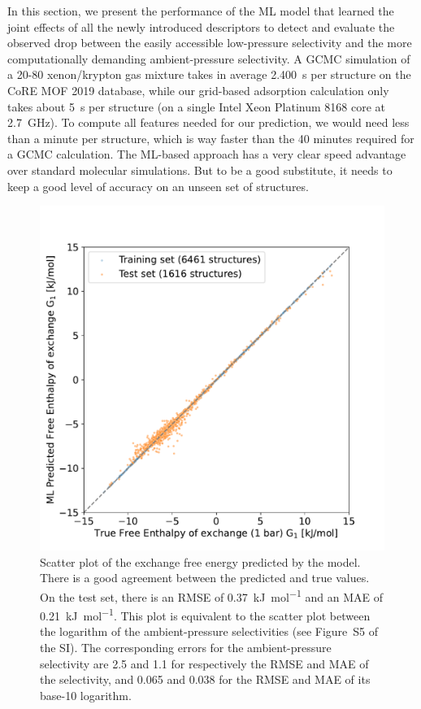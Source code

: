 \documentclass[main]{subfiles}
\begin{document}
In this section, we present the performance of the ML model that learned the joint effects of all the newly introduced descriptors to detect and evaluate the observed drop between the easily accessible low-pressure selectivity and the more computationally demanding ambient-pressure selectivity.
A GCMC simulation of a 20-80 xenon/krypton gas mixture takes in average \SI{2,400}{\second} per structure on the CoRE MOF 2019 database, while our grid-based adsorption calculation only takes about \SI{5}{\second} per structure (on a single Intel Xeon Platinum 8168 core at \SI{2.7}{\giga\hertz}). To compute all features needed for our prediction, we would need less than a minute per structure, which is way faster than the 40 minutes required for a GCMC calculation. The ML-based approach has a very clear speed advantage over standard molecular simulations. But to be a good substitute, it needs to keep a good level of accuracy on an unseen set of structures.

\begin{figure}[ht]
\centering
  \includegraphics[width=0.5\linewidth]{figures/4-ml/main/Scatterplot_G1_prediction.pdf}
  \caption{Scatter plot of the exchange free energy predicted by the model. There is a good agreement between the predicted and true values. On the test set, there is an RMSE of \SI{0.37}{\kilo\joule\per\mole} and an MAE of \SI{0.21}{\kilo\joule\per\mole}. This plot is equivalent to the scatter plot between the logarithm of the ambient-pressure selectivities (see Figure~S5 of the SI). The corresponding errors for the ambient-pressure selectivity are 2.5 and 1.1 for respectively the RMSE and MAE of the selectivity, and 0.065 and 0.038 for the RMSE and MAE of its base-10 logarithm. }
  \label{fgr:G1_prediction}
\end{figure}
\end{document}
